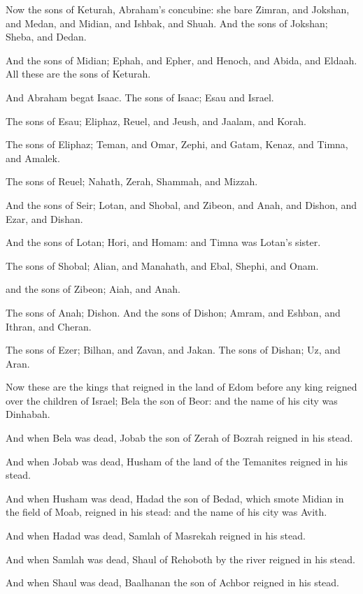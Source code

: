 \Verse Now the sons of Keturah, Abraham's concubine: she bare Zimran, and Jokshan, and Medan, and Midian, and Ishbak, and Shuah. And the sons of Jokshan; Sheba, and Dedan.

\Verse And the sons of Midian; Ephah, and Epher, and Henoch, and Abida, and Eldaah. All these are the sons of Keturah.

\Verse And Abraham begat Isaac. The sons of Isaac; Esau and Israel.

\Verse The sons of Esau; Eliphaz, Reuel, and Jeush, and Jaalam, and Korah.

\Verse The sons of Eliphaz; Teman, and Omar, Zephi, and Gatam, Kenaz, and Timna, and Amalek.

\Verse The sons of Reuel; Nahath, Zerah, Shammah, and Mizzah.

\Verse And the sons of Seir; Lotan, and Shobal, and Zibeon, and Anah, and Dishon, and Ezar, and Dishan.

\Verse And the sons of Lotan; Hori, and Homam: and Timna was Lotan's sister.

\Verse The sons of Shobal; Alian, and Manahath, and Ebal, Shephi, and Onam.

and the sons of Zibeon; Aiah, and Anah.

\Verse The sons of Anah; Dishon. And the sons of Dishon; Amram, and Eshban, and Ithran, and Cheran.

\Verse The sons of Ezer; Bilhan, and Zavan, and Jakan. The sons of Dishan; Uz, and Aran.

\Verse Now these are the kings that reigned in the land of Edom before any king reigned over the children of Israel; Bela the son of Beor: and the name of his city was Dinhabah.

\Verse And when Bela was dead, Jobab the son of Zerah of Bozrah reigned in his stead.

\Verse And when Jobab was dead, Husham of the land of the Temanites reigned in his stead.

\Verse And when Husham was dead, Hadad the son of Bedad, which smote Midian in the field of Moab, reigned in his stead: and the name of his city was Avith.

\Verse And when Hadad was dead, Samlah of Masrekah reigned in his stead.

\Verse And when Samlah was dead, Shaul of Rehoboth by the river reigned in his stead.

\Verse And when Shaul was dead, Baalhanan the son of Achbor reigned in his stead.


